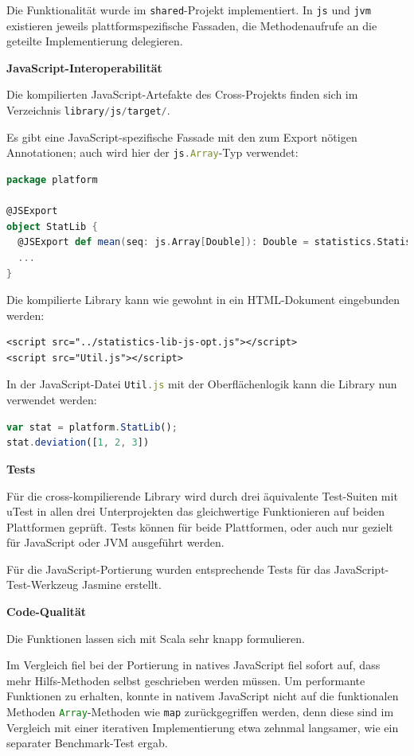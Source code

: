 \documentclass[a4paper, 12pt, hidelinks, listof=totoc, listoftables=totoc, bibliography=totoc]{scrreprt}
\newcommand{\code}[1]{\lstinline[language=Scala, style=inline]|#1|}
\newcommand{\js}[1]{\lstinline[language=JavaScript, style=inline]|#1|}
\newcommand{\MyMiniSec}[1]{\rmfamily\fontsize{12}{15}\selectfont
	\vspace{7pt}\textbf{#1} %
}
\begin{document}
Die Funktionalität wurde im \code{shared}-Projekt implementiert. In \code{js} und \code{jvm} existieren jeweils plattformspezifische Fassaden, die Methodenaufrufe an die geteilte Implementierung delegieren.


\MyMiniSec{JavaScript-Interoperabilität}

Die kompilierten JavaScript-Artefakte des Cross-Projekts finden sich im Verzeichnis \code{library/js/target/}.

Es gibt eine JavaScript-spezifische Fassade mit den zum Export nötigen Annotationen; auch wird hier der \js{js.Array}-Typ verwendet:

\begin{lstlisting}[language=Scala, style=snippet]
package platform

@JSExport
object StatLib {
  @JSExport def mean(seq: js.Array[Double]): Double = statistics.Statistics.mean(seq)
  ...
}
\end{lstlisting}

Die kompilierte Library kann wie gewohnt in ein \ac{HTML}-Dokument eingebunden werden:

\begin{lstlisting}[language=HTML5, style=snippet]
<script src="../statistics-lib-js-opt.js"></script>
<script src="Util.js"></script>
\end{lstlisting}

In der JavaScript-Datei \js{Util.js} mit der Oberflächenlogik kann die Library nun verwendet werden:

\begin{lstlisting}[language=JavaScript, style=snippet]
var stat = platform.StatLib();
stat.deviation([1, 2, 3])
\end{lstlisting}


\MyMiniSec{Tests}

Für die cross-kompilierende Library wird durch drei äquivalente Test-Suiten mit uTest in allen drei Unterprojekten das gleichwertige Funktionieren auf beiden Plattformen geprüft. Tests können für beide Plattformen, oder auch nur gezielt für JavaScript oder \ac{JVM} ausgeführt werden.

Für die JavaScript-Portierung wurden entsprechende 
Tests für das JavaScript-Test-Werkzeug Jasmine erstellt.


\MyMiniSec{Code-Qualität}

Die Funktionen lassen sich mit Scala sehr knapp formulieren.

Im Vergleich fiel bei der Portierung in natives JavaScript fiel sofort auf, dass mehr Hilfs-Methoden selbst geschrieben werden müssen. Um performante Funktionen zu erhalten, konnte in nativem JavaScript nicht auf die funktionalen Methoden \js{Array}-Methoden wie \js{map} zurückgegriffen werden, denn diese sind im Vergleich mit einer iterativen Implementierung etwa zehnmal langsamer, wie ein separater Benchmark-Test ergab.
\end{document}
